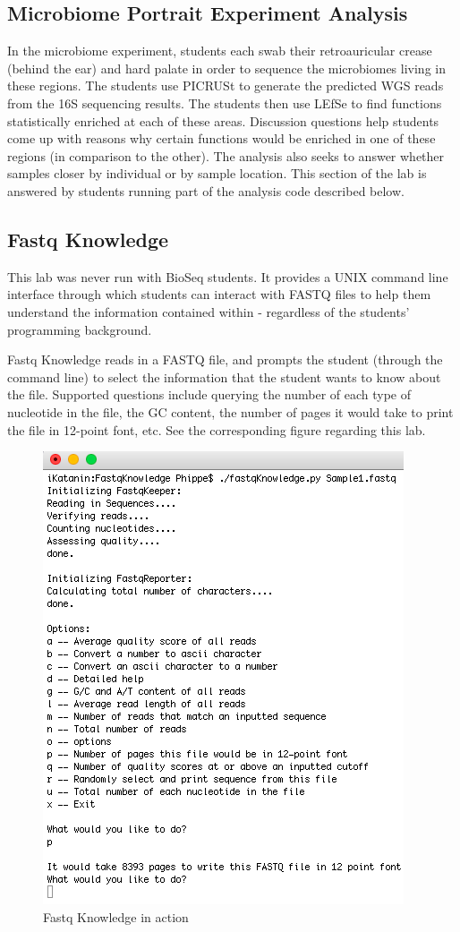 \documentclass{report}
\begin{document}
\subsection{Microbiome Portrait Experiment Analysis}
In the microbiome experiment, students each swab their retroauricular crease (behind the ear) and hard palate in order to sequence the microbiomes living in these regions. The students use PICRUSt to generate the predicted WGS reads from the 16S sequencing results. The students then use LEfSe \cite{segata2011metagenomic} to find functions statistically enriched at each of these areas. Discussion questions help students come up with reasons why certain functions would be enriched in one of these regions (in comparison to the other). The analysis also seeks to answer whether samples closer by individual or by sample location. This section of the lab is answered by students running part of the analysis code described below.

\subsection{Fastq Knowledge}
\noindent This lab was never run with BioSeq students. It provides a UNIX command line interface through which students can interact with FASTQ files to help them understand the information contained within - regardless of the students' programming background.

Fastq Knowledge reads in a FASTQ file, and prompts the student (through the command line) to select the information that the student wants to know about the file. Supported questions include querying the number of each type of nucleotide in the file, the GC content, the number of pages it would take to print the file in 12-point font, etc. See the corresponding figure regarding this lab.

\begin{figure}[h]
\centering
\includegraphics[scale=0.75]{fastqK.png}
\caption{Fastq Knowledge in action}
\end{figure}
\end{document}
